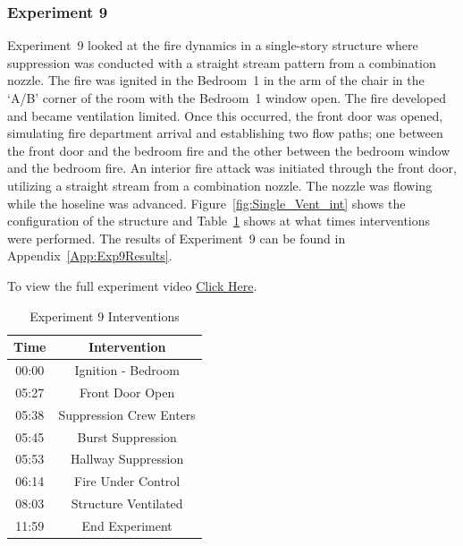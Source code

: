 \documentclass[12pt,oneside]{book}
\begin{document}
\subsubsection{Experiment 9}
Experiment~9 looked at the fire dynamics in a single-story structure where suppression was conducted with a straight stream pattern from a combination nozzle. The fire was ignited in the Bedroom~1 in the arm of the chair in the `A/B' corner of the room with the Bedroom~1 window open. The fire developed and became ventilation limited. Once this occurred, the front door was opened, simulating fire department arrival and establishing two flow paths; one between the front door and the bedroom fire and the other between the bedroom window and the bedroom fire. An interior fire attack was initiated through the front door, utilizing a straight stream from a combination nozzle. The nozzle was flowing while the hoseline was advanced. Figure~\ref{fig:Single_Vent_int} shows the configuration of the structure and Table~\ref{Table:Exp9Interventions} shows at what times interventions were performed. The results of Experiment~9 can be found in Appendix~\ref{App:Exp9Results}. 

To view the full experiment video \href{https://player.vimeo.com/video/170510938?autoplay=1}{Click Here}.

\begin{table}[H]
	\centering
	\caption{Experiment 9 Interventions}
	\begin{tabular}{|c|c|} 
		\hline
		Time & Intervention \\ \hline \hline
		00:00 & Ignition - Bedroom \\ \hline
		05:27 & Front Door Open \\ \hline
		05:38 & Suppression Crew Enters\\ \hline
		05:45 & Burst Suppression \\ \hline 
		05:53 & Hallway Suppression \\ \hline
		06:14 & Fire Under Control 	\\ \hline
		08:03 & Structure Ventilated \\ \hline
		11:59 & End Experiment\\ \hline
	\end{tabular}
	\label{Table:Exp9Interventions}
\end{table}

\FloatBarrier
\clearpage
\end{document}
